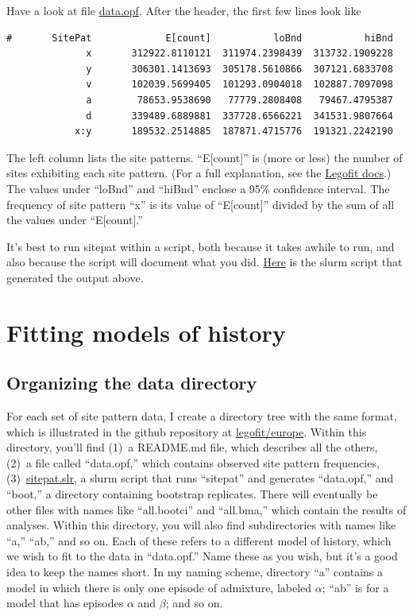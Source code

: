 \documentclass[11pt]{article}
\begin{document}
Have a look at file
\href{https://github.com/alanrogers/agar22/blob/main/legofit/europe/data.opf}{data.opf}. After
the header, the first few lines look like
\begin{verbatim}
#       SitePat             E[count]           loBnd           hiBnd
              x       312922.8110121  311974.2398439  313732.1909228
              y       306301.1413693  305178.5610866  307121.6833708
              v       102039.5699405  101293.0904018  102887.7097098
              a        78653.9538690   77779.2808408   79467.4795387
              d       339489.6889881  337728.6566221  341531.9807664
            x:y       189532.2514885  187871.4715776  191321.2242190
\end{verbatim}
The left column lists the site patterns. ``E[count]'' is (more or
less) the number of sites exhibiting each site pattern. (For a full
explanation, see the
\href{https://alanrogers.github.io/legofit/html/index.html#sitepattern}{Legofit
  docs}.) The values under ``loBnd'' and ``hiBnd'' enclose a 95\%
confidence interval. The frequency of site pattern ``x'' is its value
of ``E[count]'' divided by the sum of all the values under ``E[count].''

It's best to run sitepat within a script, both because it takes awhile
to run, and also because the script will document what you did.
\href{https://github.com/alanrogers/agar22/blob/main/legofit/europe/sitepat.slr}{Here}
is the slurm script that generated the output above.

\section{Fitting models of history}
\label{sec.fit}
\subsection{Organizing the data directory}
For each set of site pattern data, I create a directory tree with the
same format, which is illustrated in the github repository at
\href{https://github.com/alanrogers/agar22/tree/main/legofit/europe}{legofit/europe}. Within
this directory, you'll find (1)~a README.md file, which describes all
the others, (2)~a file called ``data.opf,'' which contains observed
site pattern frequencies, (3)~\href{sitepat.slr.html}{sitepat.slr}, a
slurm script that runs ``sitepat'' and generates ``data.opf,'' and
``boot,'' a directory containing bootstrap replicates.  There will
eventually be other files with names like ``all.bootci'' and
``all.bma,'' which contain the results of analyses.  Within this
directory, you will also find subdirectories with names like ``a,''
``ab,'' and so on. Each of these refers to a different model of
history, which we wish to fit to the data in ``data.opf.''  Name these
as you wish, but it's a good idea to keep the names short. In my
naming scheme, directory ``a'' contains a model in which there is only
one episode of admixture, labeled $\alpha$; ``ab'' is for a model that
has episodes $\alpha$ and $\beta$; and so on.
\end{document}
